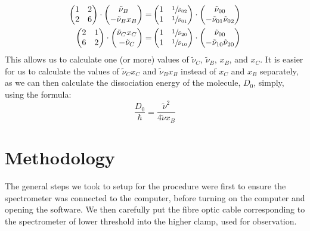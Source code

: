 \documentclass{article}
\begin{document}
\begin{align}
    \begin{pmatrix}
        1 & 2\\
        2 & 6
    \end{pmatrix}
    \cdot
    \begin{pmatrix}
        \tilde{\nu}_B\\
        -\tilde{\nu}_Bx_B
    \end{pmatrix}
    =&
    \begin{pmatrix}
        1&\sfrac{1}{\tilde{\nu}_{02}}\\
        1&\sfrac{1}{\tilde{\nu}_{01}}
    \end{pmatrix}
    \cdot
    \begin{pmatrix}
        \tilde{\nu}_{00}\\
        -\tilde{\nu}_{01}\tilde{\nu}_{02}
    \end{pmatrix}\\
    \begin{pmatrix}
        2 & 1\\
        6 & 2
    \end{pmatrix}
    \cdot
    \begin{pmatrix}
        \tilde{\nu}_Cx_C\\
        -\tilde{\nu}_C\\
    \end{pmatrix}
    =&
    \begin{pmatrix}
        1&\sfrac{1}{\tilde{\nu}_{20}}\\
        1&\sfrac{1}{\tilde{\nu}_{10}}
    \end{pmatrix}
    \cdot
    \begin{pmatrix}
        \tilde{\nu}_{00}\\
        -\tilde{\nu}_{10}\tilde{\nu}_{20}
    \end{pmatrix}
\end{align}
This allows us to calculate one (or more) values of $\tilde{\nu}_C$, $\tilde{\nu}_B$, $x_B$, and $x_C$.  It is easier for us to calculate the values of $\tilde{\nu}_Cx_C$ and $\tilde{\nu}_Bx_B$ instead of $x_C$ and $x_B$ separately, as we can then calculate the dissociation energy of the molecule, $D_0$, simply, using the formula:
\begin{equation}
    \frac{D_0}{\hbar} = \frac{\tilde{\nu}^2}{4\tilde{\nu}x_B}
\end{equation}

\section{Methodology}
The general steps we took to setup for the procedure were first to ensure the spectrometer was connected to the computer, before turning on the computer and opening the software. We then carefully put the fibre optic cable corresponding to the spectrometer of lower threshold  into the higher clamp, used for observation.
\end{document}

